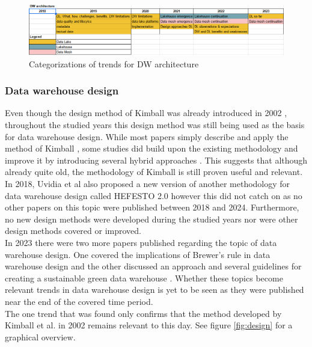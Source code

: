 \documentclass[11pt]{article}
\begin{document}
\begin{figure}
\centering
\includegraphics[scale=0.6]{Images/architecture.png}
\caption{Categorizations of trends for DW architecture}
\label{fig:arch}
\end{figure}

\subsubsection{Data warehouse design}
\label{results:trends:design}
Even though the design method of Kimball was already introduced in 2002 \cite{kimball2011data}, throughout the studied years this design method was still being used as the basis for data warehouse design. While most papers simply describe and apply the method of Kimball \cite{Ramadhani202188, Himami2021146, Wahyudi2019, Rahutomo2018128}, some studies did build upon the existing methodology and improve it by introducing several hybrid approaches \cite{Takács20201}. This suggests that although already quite old, the methodology of Kimball is still proven useful and relevant. \\

In 2018, Uvidia et al also proposed a new version of another methodology for data warehouse design called HEFESTO 2.0 \cite{uvidia2017moving} however this did not catch on as no other papers on this topic were published between 2018 and 2024. Furthermore, no new design methods were developed during the studied years nor were other design methods covered or improved. \\

In 2023 there were two more papers published regarding the topic of data warehouse design. One covered the implications of Brewer's rule in data warehouse design \cite{raman2023implications} and the other discussed an approach and several guidelines for creating a sustainable green data warehouse \cite{letrache2018green}. Whether these topics become relevant trends in data warehouse design is yet to be seen as they were published near the end of the covered time period. \\

The one trend that was found only confirms that the method developed by Kimball et al. in 2002 remains relevant to this day. See figure \ref{fig:design} for a graphical overview. \\
\end{document}

